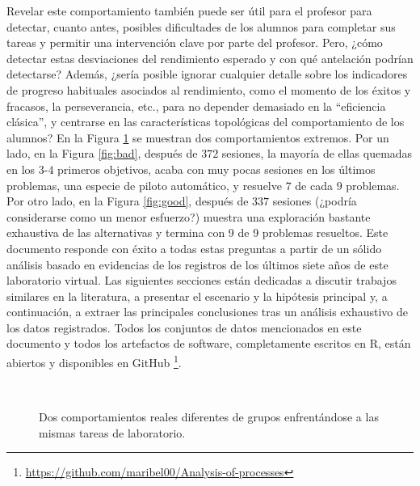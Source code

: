 Revelar este comportamiento también puede ser útil para el profesor para detectar, cuanto antes, posibles dificultades de los alumnos para completar sus tareas y permitir una intervención clave por parte del profesor. Pero, ¿cómo detectar estas desviaciones del rendimiento esperado y con qué antelación podrían detectarse? Además, ¿sería posible ignorar cualquier detalle sobre los indicadores de progreso habituales asociados al rendimiento, como el momento de los éxitos y fracasos, la perseverancia, etc., para no depender demasiado en la ``eficiencia clásica'', y centrarse en las características topológicas del comportamiento de los alumnos? En la Figura \ref{fig:extreme} se muestran dos comportamientos extremos. Por un lado, en la Figura \ref{fig:bad}, después de $372$ sesiones, la mayoría de ellas quemadas en los $3$-$4$ primeros objetivos, acaba con muy pocas sesiones en los últimos problemas, una especie de piloto automático, y resuelve $7$ de cada $9$ problemas. Por otro lado, en la Figura \ref{fig:good}, después de $337$ sesiones (¿podría considerarse como un menor esfuerzo?) muestra una exploración bastante exhaustiva de las alternativas y termina con 9 de 9 problemas resueltos. Este
documento responde con éxito a todas estas preguntas a partir de un sólido análisis basado en evidencias de los registros de los últimos siete años de este laboratorio virtual. Las siguientes secciones están dedicadas a discutir trabajos similares en la literatura, a presentar el escenario y la hipótesis principal y, a continuación, a extraer las principales conclusiones tras un análisis exhaustivo de los datos registrados. Todos los conjuntos de datos mencionados en este documento y todos los artefactos de software, completamente escritos en R, están abiertos y disponibles en GitHub \footnote{\href{https://github.com/maribel00/Analysis-of-processes}{https://github.com/maribel00/Analysis-of-processes}}.

\begin{figure}[H]
\centering
{}\\
\caption{Dos comportamientos reales diferentes de grupos enfrentándose a las mismas tareas de laboratorio.}
\label{fig:extreme}
\end{figure}

